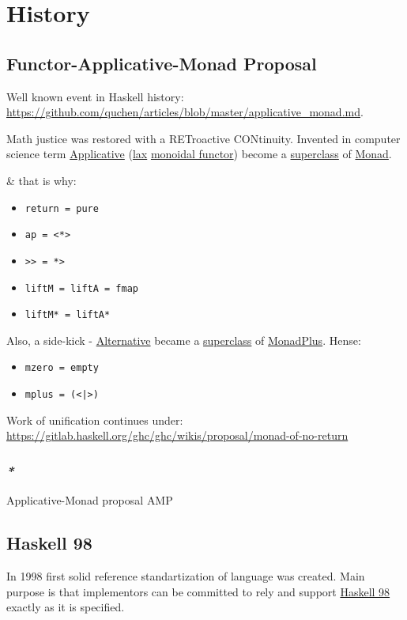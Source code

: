 \documentclass[a4paper,14pt,oneside]{book}
\begin{document}
\chapter{History}
\label{sec:orga5d4611}
\section{\label{org31618a8}Functor-Applicative-Monad Proposal}
\label{sec:orgcacd589}
Well known event in Haskell history: \url{https://github.com/quchen/articles/blob/master/applicative\_monad.md}.

Math justice was restored with a RETroactive CONtinuity. Invented in computer science term \hyperref[orgffb5e0c]{Applicative} (\hyperref[org031fca1]{lax} \hyperref[org763729a]{monoidal functor}) become a \hyperref[org6cc3554]{superclass} of \hyperref[org3b2177c]{Monad}.

\& that is why:
\begin{itemize}
\item \texttt{return = pure}
\item \texttt{ap = <*>}
\item \texttt{>> = *>}
\item \texttt{liftM = liftA = fmap}
\item \texttt{liftM* = liftA*}
\end{itemize}

Also, a side-kick - \hyperref[org8057d0c]{Alternative} became a \hyperref[org6cc3554]{superclass} of \hyperref[org10fd16b]{MonadPlus}. Hense:
\begin{itemize}
\item \texttt{mzero = empty}
\item \texttt{mplus = (<|>)}
\end{itemize}

Work of unification continues under: \url{https://gitlab.haskell.org/ghc/ghc/wikis/proposal/monad-of-no-return}

\subsection{\emph{*}}
\label{sec:org2276128}

\label{org9538702}Applicative-Monad proposal
\label{org5dea53c}AMP

\section{\label{org7495aa0}Haskell 98}
\label{sec:orgfe61be7}
In 1998 first solid reference standartization of language was created. Main purpose is that implementors can be committed to rely and support \hyperref[org7495aa0]{Haskell 98} exactly as it is specified.
\end{document}
